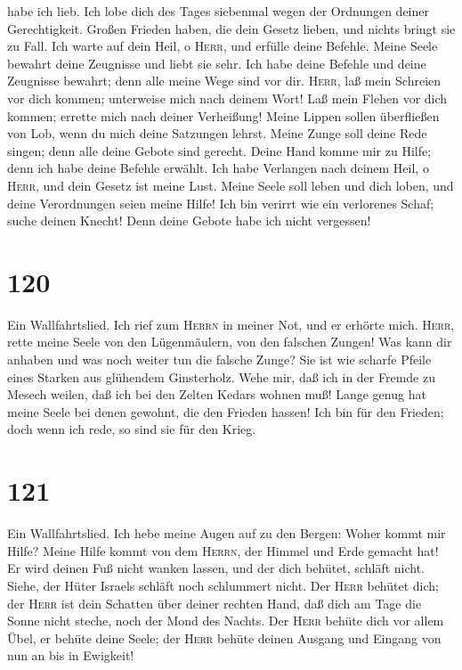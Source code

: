 habe ich lieb.  Ich lobe dich des Tages siebenmal wegen
der Ordnungen deiner Gerechtigkeit.  Großen Frieden
haben, die dein Gesetz lieben, und nichts bringt sie zu Fall.
 Ich warte auf dein Heil, o \textsc{Herr}, und erfülle
deine Befehle.  Meine Seele bewahrt deine Zeugnisse und
liebt sie sehr.  Ich habe deine Befehle und deine
Zeugnisse bewahrt; denn alle meine Wege sind vor dir. 
\textsc{Herr}, laß mein Schreien vor dich kommen; unterweise mich nach
deinem Wort!  Laß mein Flehen vor dich kommen; errette
mich nach deiner Verheißung!  Meine Lippen sollen
überfließen von Lob, wenn du mich deine Satzungen lehrst.
 Meine Zunge soll deine Rede singen; denn alle deine
Gebote sind gerecht.  Deine Hand komme mir zu Hilfe;
denn ich habe deine Befehle erwählt.  Ich habe Verlangen
nach deinem Heil, o \textsc{Herr}, und dein Gesetz ist meine Lust.
 Meine Seele soll leben und dich loben, und deine
Verordnungen seien meine Hilfe!  Ich bin verirrt wie ein
verlorenes Schaf; suche deinen Knecht! Denn deine Gebote habe ich nicht
vergessen!

\hypertarget{section-119}{%
\section{120}\label{section-119}}

 Ein Wallfahrtslied. Ich rief zum \textsc{Herrn} in meiner
Not, und er erhörte mich.  \textsc{Herr}, rette meine
Seele von den Lügenmäulern, von den falschen Zungen!  Was
kann dir anhaben und was noch weiter tun die falsche Zunge?
 Sie ist wie scharfe Pfeile eines Starken aus glühendem
Ginsterholz.  Wehe mir, daß ich in der Fremde zu Mesech
weilen, daß ich bei den Zelten Kedars wohnen muß!  Lange
genug hat meine Seele bei denen gewohnt, die den Frieden hassen!
 Ich bin für den Frieden; doch wenn ich rede, so sind sie
für den Krieg.

\hypertarget{section-120}{%
\section{121}\label{section-120}}

 Ein Wallfahrtslied. Ich hebe meine Augen auf zu den
Bergen: Woher kommt mir Hilfe?  Meine Hilfe kommt von dem
\textsc{Herrn}, der Himmel und Erde gemacht hat!  Er wird
deinen Fuß nicht wanken lassen, und der dich behütet, schläft nicht.
 Siehe, der Hüter Israels schläft noch schlummert nicht.
 Der \textsc{Herr} behütet dich; der \textsc{Herr} ist
dein Schatten über deiner rechten Hand,  daß dich am Tage
die Sonne nicht steche, noch der Mond des Nachts.  Der
\textsc{Herr} behüte dich vor allem Übel, er behüte deine Seele;
 der \textsc{Herr} behüte deinen Ausgang und Eingang von
nun an bis in Ewigkeit!

